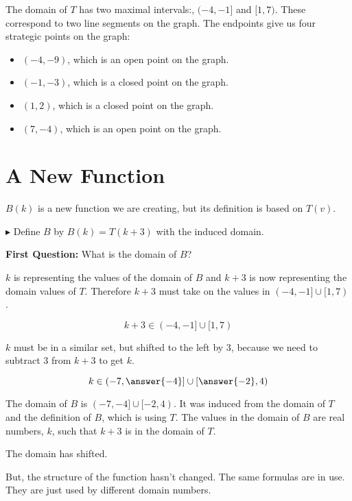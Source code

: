 \documentclass{ximera}
\begin{document}
The domain of $T$ has two maximal intervals:, $(-4,-1]$ and $[1,7)$.  These correspond to two line segments on the graph. The endpoints give us four strategic points on the graph: 

\begin{itemize}

\item $(-4, -9)$, which is an open point on the graph.
\item $(-1, -3)$, which is a closed point on the graph.
\item $(1, 2)$, which is a closed point on the graph.
\item $(7, -4)$, which is an open point on the graph.

\end{itemize}




\section{A New Function}

$B(k)$ is a new function we are creating, but its definition is based on $T(v)$.


$\blacktriangleright$ Define $B$ by $B(k) = T(k+3)$ with the induced domain.


\textbf{\textcolor{purple!85!blue}{First Question:}}   What is the domain of $B$?


\begin{explanation}

$k$ is representing the values of the domain of $B$ and $k+3$ is now representing the domain values of $T$.  Therefore $k+3$ must take on the values in $(-4,-1] \cup [1,7)$.

\[     k+3 \in      (-4,-1] \cup [1,7)     \]


$k$ must be in a similar set, but shifted to the left by $3$, because we need to subtract $3$ from $k+3$ to get $k$.


\[     k \in      \left( -7,\answer{-4} \right] \cup \left[ \answer{-2},4 \right)     \]


The domain of $B$ is $(-7,-4] \cup [-2,4)$.   It was induced from the domain of $T$ and the definition of $B$, which is using $T$.  The values in the domain of $B$ are real numbers, $k$, such that $k+3$ is in the domain of $T$.

The domain has shifted. 


But, the structure of the function hasn't changed.  The same formulas are in use.  They are just used by different domain numbers.
\end{explanation}
\end{document}
